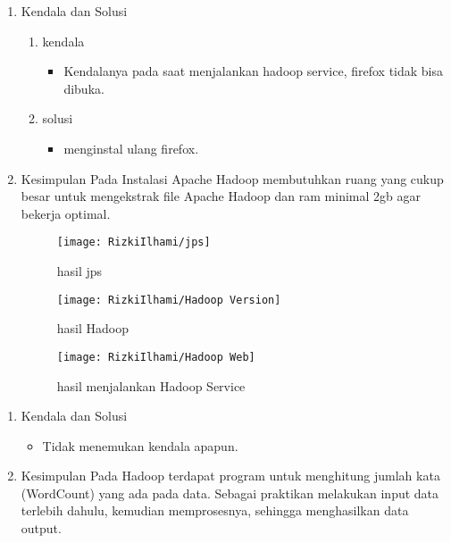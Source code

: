 

\begin{enumerate}

\item Kendala dan Solusi
\begin{enumerate}
    \item kendala
\begin{itemize}
    \item Kendalanya pada saat menjalankan hadoop service, firefox tidak bisa dibuka.
\end{itemize}
    \item solusi
\begin{itemize}
    \item menginstal ulang firefox.
\end{itemize}
\end{enumerate}

\item Kesimpulan
\newline
    Pada Instalasi Apache Hadoop membutuhkan ruang yang
    cukup besar untuk mengekstrak file Apache Hadoop dan ram
    minimal 2gb agar bekerja optimal.


\begin{figure}[!ht]
    \texttt{[image: RizkiIlhami/jps]}
    \caption{hasil jps}
    \label{gam:Hasil}
\end{figure}

\begin{figure}[!ht]
    \texttt{[image: RizkiIlhami/Hadoop Version]}
    \caption{hasil Hadoop}
    \label{gam:Hasil}
\end{figure}

\begin{figure}[!ht]
    \texttt{[image: RizkiIlhami/Hadoop Web]}
    \caption{hasil menjalankan Hadoop Service}
    \label{gam:Hasil}
\end{figure}

\end{enumerate}

\clearpage
{}
\begin{enumerate}
\item Kendala dan Solusi

\begin{itemize}
\item Tidak menemukan kendala apapun.
\end{itemize}

\item Kesimpulan
\newline
    Pada Hadoop terdapat program untuk menghitung jumlah kata 
    (WordCount) yang ada pada data. Sebagai praktikan melakukan input data terlebih
    dahulu, kemudian memprosesnya, sehingga menghasilkan data output.

\end{enumerate}


